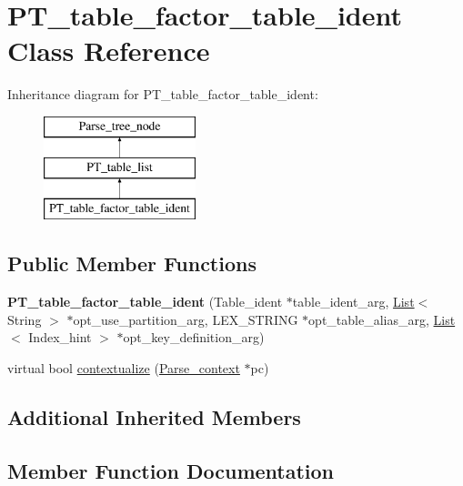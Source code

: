 \hypertarget{classPT__table__factor__table__ident}{}\section{P\+T\+\_\+table\+\_\+factor\+\_\+table\+\_\+ident Class Reference}
\label{classPT__table__factor__table__ident}
Inheritance diagram for P\+T\+\_\+table\+\_\+factor\+\_\+table\+\_\+ident\+:\begin{figure}[H]
\begin{center}
\leavevmode
\includegraphics[height=3.000000cm]{classPT__table__factor__table__ident}
\end{center}
\end{figure}
\subsection*{Public Member Functions}
\begin{DoxyCompactItemize}
\item 
\mbox{\label{classPT__table__factor__table__ident_a49a67c7f663af3acf9229d0b653eb5f4}} 
{\bfseries P\+T\+\_\+table\+\_\+factor\+\_\+table\+\_\+ident} (Table\+\_\+ident $\ast$table\+\_\+ident\+\_\+arg, \mbox{\hyperlink{classList}{List}}$<$ String $>$ $\ast$opt\+\_\+use\+\_\+partition\+\_\+arg, L\+E\+X\+\_\+\+S\+T\+R\+I\+NG $\ast$opt\+\_\+table\+\_\+alias\+\_\+arg, \mbox{\hyperlink{classList}{List}}$<$ Index\+\_\+hint $>$ $\ast$opt\+\_\+key\+\_\+definition\+\_\+arg)
\item 
virtual bool \mbox{\hyperlink{classPT__table__factor__table__ident_af45d5e66b0d6c6250f39a82eb526fe70}{contextualize}} (\mbox{\hyperlink{structParse__context}{Parse\+\_\+context}} $\ast$pc)
\end{DoxyCompactItemize}
\subsection*{Additional Inherited Members}


\subsection{Member Function Documentation}
\mbox{\label{classPT__table__factor__table__ident_af45d5e66b0d6c6250f39a82eb526fe70}} 
